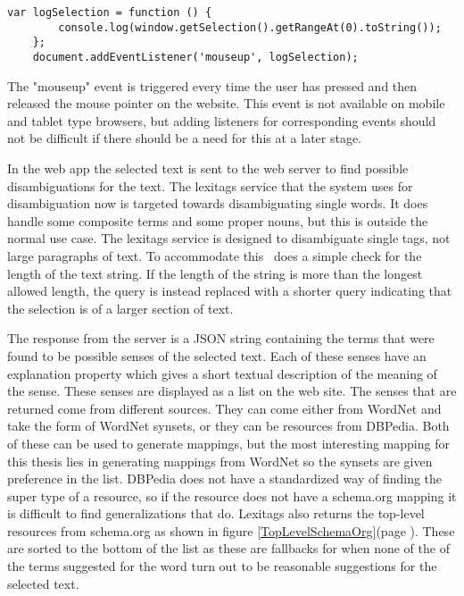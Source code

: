 \begin{lstlisting}[caption={Logging selected text}, label=DOMSelection]
	var logSelection = function () {
		console.log(window.getSelection().getRangeAt(0).toString());
	};
	document.addEventListener('mouseup', logSelection);
\end{lstlisting}

The "mouseup" event is triggered every time the user has pressed and then released the mouse pointer on the website.
This event is not available on mobile and tablet type browsers,
but adding listeners for corresponding events should not be difficult if there should be a need for this at a later stage.

In the web app the selected text is sent to the web server to find possible disambiguations for the text.
The lexitags service that the system uses for disambiguation now is targeted towards disambiguating single words.
It does handle some composite terms and some proper nouns, but this is outside the normal use case.
The lexitags service is designed to disambiguate single tags, not large paragraphs of text.
To accommodate this \theartefact\ does a simple check for the length of the text string.
If the length of the string is more than the longest allowed length,
the query is instead replaced with a shorter query indicating that the selection is of a larger section of text.

The response from the server is a JSON string containing the terms that were found to be possible senses of the selected text.
Each of these senses have an explanation property which gives a short textual description of the meaning of the sense.
These senses are displayed as a list on the web site.
The senses that are returned come from different sources.
They can come either from WordNet and take the form of WordNet synsets, or they can be resources from DBPedia.
Both of these can be used to generate mappings,
but the most interesting mapping for this thesis lies in generating mappings from WordNet so the synsets are given preference in the list.
DBPedia does not have a standardized way of finding the super type of a resource,
so if the resource does not have a schema.org mapping it is difficult to find generalizations that do.
Lexitags also returns the top-level resources from schema.org as shown in figure \ref{TopLevelSchemaOrg}(page \pageref{TopLevelSchemaOrg}).
These are sorted to the bottom of the list as these are fallbacks for when none of the of the terms suggested for
the word turn out to be reasonable suggestions for the selected text.

